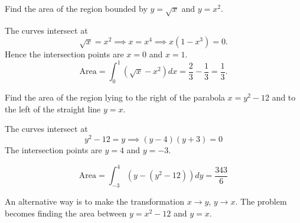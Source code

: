 \documentclass[calc1-main.tex]{subfiles}
\begin{document}
\begin{example}
	Find the area of the region bounded by $y=\sqrt{x}$ and $y=x^2$.
\end{example}
\begin{minipage}{0.5\textwidth}
  \begin{solution}
  	The curves intersect at
  	\[
  		\sqrt{x} = x^2 \implies x = x^4 \implies x(1-x^3) = 0.
  	\]
  	Hence the intersection points are $x=0$ and $x=1$.
  	\[
  		\text{Area} = \int_0^1 \left( \sqrt{x} - x^2 \right) dx = \frac{2}{3} - \frac{1}{3} = \frac{1}{3}.
  	\]
  \end{solution}
\end{minipage}%
\begin{minipage}{0.5\textwidth}
  \begin{figure}[H]
    	\centering
    	
   \end{figure}
\end{minipage}

\begin{example}
	Find the area of the region lying to the right of the parabola $x=y^2-12$ and to the left of the straight line $y=x$.
\end{example}
\begin{minipage}{0.5\textwidth}
  \begin{solution}
  	The curves intersect at
  	\[
  		y^2 - 12 = y \implies (y-4)(y+3) = 0
  	\]
  	The intersection points are $y=4$ and $y=-3$.

  	\[
  		\text{Area} = \int_{-3}^4 \left( y - (y^2-12)  \right) dy = \frac{343}{6}
  	\]

  	An alternative way is to make the transformation $x \to y$, $y \to x$. The problem becomes finding the area between $y=x^2-12$ and $y=x$.
  \end{solution}
\end{minipage}%
\begin{minipage}{0.5\textwidth}
  \begin{figure}[H]
    	\centering
    	
   \end{figure}
\end{minipage}
\end{document}
